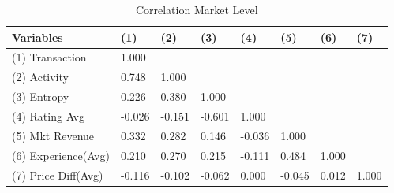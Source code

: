 \begin{table}
\centering
\begin{tabular}{@{}llllllll@{}}
\toprule
Variables           & (1)    & (2)    & (3)    & (4)    & (5)    & (6)   & (7)   \\ \midrule
(1) Transaction     & 1.000  &        &        &        &        &       &       \\
(2) Activity        & 0.748  & 1.000  &        &        &        &       &       \\
(3) Entropy         & 0.226  & 0.380  & 1.000  &        &        &       &       \\
(4) Rating Avg      & -0.026 & -0.151 & -0.601 & 1.000  &        &       &       \\
(5) Mkt Revenue     & 0.332  & 0.282  & 0.146  & -0.036 & 1.000  &       &       \\
(6) Experience(Avg) & 0.210  & 0.270  & 0.215  & -0.111 & 0.484  & 1.000 &       \\
(7) Price Diff(Avg) & -0.116 & -0.102 & -0.062 & 0.000  & -0.045 & 0.012 & 1.000 \\ \bottomrule
\end{tabular}
\caption{Correlation Market Level}
\label{corr_mkt}
\end{table}